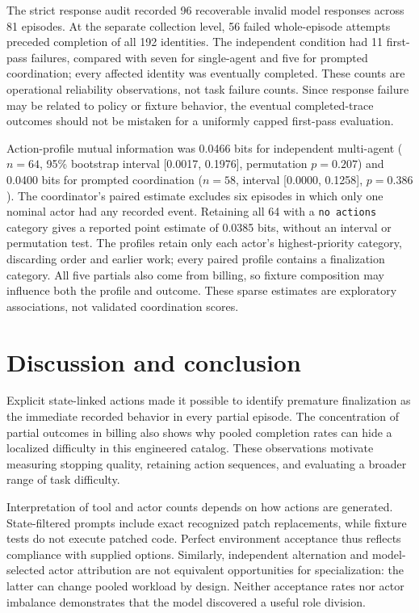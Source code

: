 \documentclass[conference]{IEEEtran}
\begin{document}
The strict response audit recorded 96 recoverable invalid model responses across 81 episodes. At the separate collection level, 56 failed whole-episode attempts preceded completion of all 192 identities. The independent condition had 11 first-pass failures, compared with seven for single-agent and five for prompted coordination; every affected identity was eventually completed. These counts are operational reliability observations, not task failure counts. Since response failure may be related to policy or fixture behavior, the eventual completed-trace outcomes should not be mistaken for a uniformly capped first-pass evaluation.

Action-profile mutual information was 0.0466 bits for independent multi-agent ($n=64$, 95\% bootstrap interval [0.0017, 0.1976], permutation $p=0.207$) and 0.0400 bits for prompted coordination ($n=58$, interval [0.0000, 0.1258], $p=0.386$). The coordinator's paired estimate excludes six episodes in which only one nominal actor had any recorded event. Retaining all 64 with a \texttt{no actions} category gives a reported point estimate of 0.0385 bits, without an interval or permutation test. The profiles retain only each actor's highest-priority category, discarding order and earlier work; every paired profile contains a finalization category. All five partials also come from billing, so fixture composition may influence both the profile and outcome. These sparse estimates are exploratory associations, not validated coordination scores.

\section{Discussion and conclusion}

Explicit state-linked actions made it possible to identify premature finalization as the immediate recorded behavior in every partial episode. The concentration of partial outcomes in billing also shows why pooled completion rates can hide a localized difficulty in this engineered catalog. These observations motivate measuring stopping quality, retaining action sequences, and evaluating a broader range of task difficulty.

Interpretation of tool and actor counts depends on how actions are generated. State-filtered prompts include exact recognized patch replacements, while fixture tests do not execute patched code. Perfect environment acceptance thus reflects compliance with supplied options. Similarly, independent alternation and model-selected actor attribution are not equivalent opportunities for specialization: the latter can change pooled workload by design. Neither acceptance rates nor actor imbalance demonstrates that the model discovered a useful role division.
\end{document}
